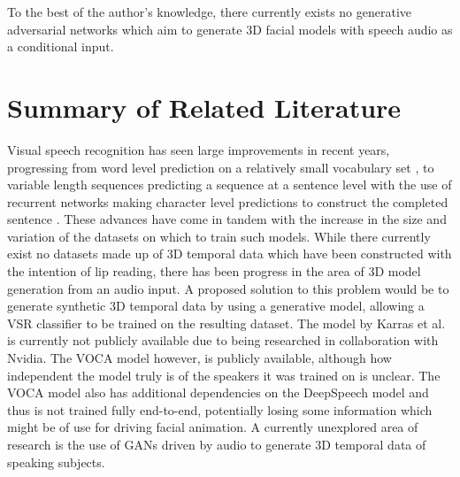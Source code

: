 To the best of the author's knowledge, there currently exists no generative adversarial networks which aim to generate 3D facial models with speech audio as a conditional input.

\section{Summary of Related Literature}
Visual speech recognition has seen large improvements in recent years, progressing from word level prediction on a relatively small vocabulary set \cite{Chung2016}, to variable length sequences predicting a sequence at a sentence level with the use of recurrent networks making character level predictions to construct the completed sentence \cite{Shillingford2018}.
These advances have come in tandem with the increase in the size and variation of the datasets on which to train such models.
While there currently exist no datasets made up of 3D temporal data which have been constructed with the intention of lip reading, there has been progress in the area of 3D model generation from an audio input.
A proposed solution to this problem would be to generate synthetic 3D temporal data by using a generative model, allowing a VSR classifier to be trained on the resulting dataset.
The model by Karras et al. is currently not publicly available due to being researched in collaboration with Nvidia.
The VOCA model however, is publicly available, although how independent the model truly is of the speakers it was trained on is unclear.
The VOCA model also has additional dependencies on the DeepSpeech model and thus is not trained fully end-to-end, potentially losing some information which might be of use for driving facial animation.
A currently unexplored area of research is the use of GANs driven by audio to generate 3D temporal data of speaking subjects.
